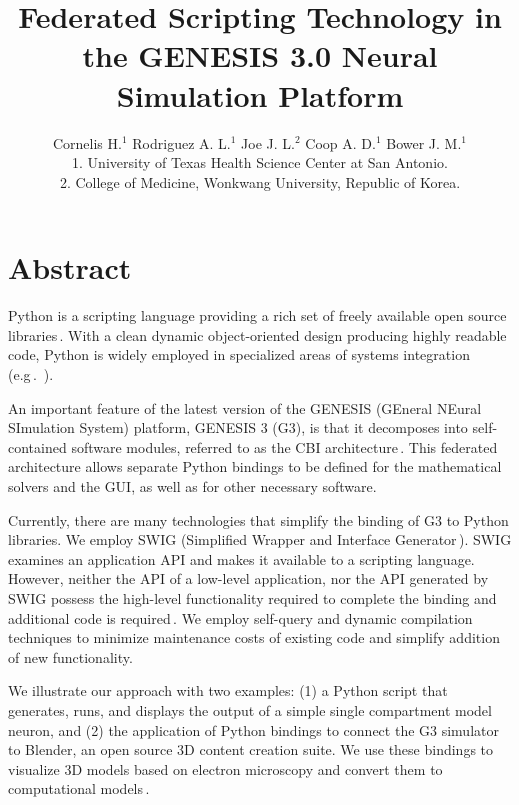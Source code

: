 \documentclass[12pt]{article}
\begin{document}
\title{Federated Scripting Technology in the GENESIS 3.0 Neural
  Simulation Platform}

\author{Cornelis H.$^1$ Rodriguez A. L.$^1$ Joe J. L.$^2$ Coop A. D.$^1$ Bower J. M.$^1$\\
  {\small 1. University of Texas Health Science Center at San Antonio.} \\
  {\small 2. College of Medicine, Wonkwang University, Republic of Korea.}
}

\maketitle
{}
\section*{Abstract}
Python is a scripting language providing a rich set of freely
available open source
libraries\,\cite{langtangen04:_python_scrip_comput_scien}. With a
clean dynamic object-oriented design producing highly readable code,
Python is widely employed in specialized areas of systems integration
(e.g\,.~\cite{thiruvathukal01:_web_progr_python}).

An important feature of the latest version of the GENESIS (GEneral
NEural SImulation System) platform, GENESIS 3 (G3), is that it
decomposes into self-contained software modules, referred to as the
CBI architecture\,\cite{cornelis08:_cbi_archit_comput_simul_realis}.
This federated architecture allows separate Python bindings to be
defined for the mathematical solvers and the GUI, as well as for other
necessary software.

Currently, there are many technologies that simplify the binding of G3
to Python libraries.  We employ SWIG (Simplified Wrapper and Interface
Generator\,\cite{08:_simpl_wrapp_inter_gener}).  SWIG examines an
application API and makes it available to a scripting language.
However, neither the API of a low-level application, nor the API
generated by SWIG possess the high-level functionality required to
complete the binding and additional code is
required\,\cite{08:_swig_python}. We employ self-query and dynamic
compilation techniques to minimize maintenance costs of existing code
and simplify addition of new functionality.

We illustrate our approach with two examples: (1) a Python script that
generates, runs, and displays the output of a simple single
compartment model neuron, and (2) the application of Python bindings
to connect the G3 simulator to Blender, an open source 3D content
creation suite.  We use these bindings to visualize 3D models based on
electron microscopy and convert them to computational
models\,\cite{cornelis08:_model_neuros_genes}.
\end{document}
